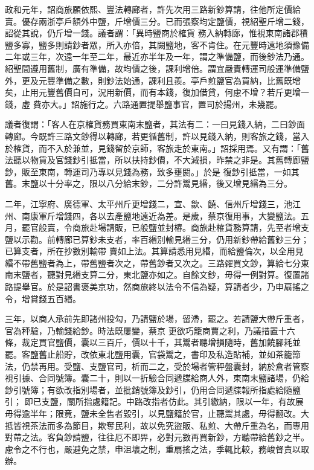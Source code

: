 \begin{pinyinscope}
 政和元年，詔商旅願依熙、豐法轉廊者，許先次用三路新鈔算請，往他所定價給賣。優存兩浙亭戶額外中鹽，斤增價三分。已而張察均定鹽價，視紹聖斤增二錢，詔從其說，仍斤增一錢。議者謂：「異時鹽商於榷貨
 務入納轉廊，惟視東南諸郡積鹽多寡，鹽多則請鈔者眾，所入亦倍，其闕鹽地，客不肯住。在元豐時遠地須豫備二年或三年，次遠一年至二年，最近亦半年及一年，謂之準備鹽，而後鈔法乃通。紹聖間遵用舊制，廣有準備，故均價之後，課利增倍。謂宜嚴責轉運司般運準備鹽外，更及元豐準備之數，則鈔法始通，課利且羨。亭戶煎鹽官為買納，比舊既增矣，止用元豐舊價自可，況用新價，而有本錢，復加借貸，何慮不增？若斤更增一錢，虛
 費亦大。」詔施行之。六路通置提舉鹽事官，置司於揚州，未幾罷。



 議者復謂：「客人在京榷貨務買東南末鹽者，其法有二：一曰見錢入納，二曰鈔面轉廊。今既許三路文鈔得以轉廊，若更循舊制，許以見錢入納，則客旅之錢，當入於榷貨，而不入於兼並，見錢留於京師，客旅走於東南。」詔採用焉。又有謂：「舊法聽以物貨及官錢鈔引抵當，所以扶持鈔價，不大減損，昨禁之非是。其舊轉廊鹽鈔，販至東南，轉運司乃專以見錢為務，致多壅閼。」於是
 復鈔引抵當，一如其舊。末鹽以十分率之，限以八分給末鈔，二分許鬻見緡，後又增見緡為三分。



 二年，江寧府、廣德軍、太平州斤更增錢二，宣、歙、饒、信州斤增錢三，池江州、南康軍斤增錢四，各以去產鹽地遠近為差。是歲，蔡京復用事，大變鹽法。五月，罷官般賣，令商旅赴場請販，已般鹽並封樁。商旅赴榷貨務算請，先至者增支鹽以示勸。前轉廊已算鈔未支者，率百緡別輸見緡三分，仍用新鈔帶給舊鈔三分；已算支者，所在抄數別輸帶
 賣如上法。其算請悉用見緡，而給鹽倫次，以全用見緡不帶舊鹽者為上，帶舊鹽者次之，帶舊鈔者又次之。三路糴買文鈔，算給七分東南末鹽者，聽對見緡支算二分，東北鹽亦如之。自餘文鈔，毋得一例對算。復置諸路提舉官。於是詔書褒美京功，然商旅終以法令不信為疑，算請者少，乃申扇搖之令，增賞錢五百緡。



 三年，以商人承前先即諸州投勾，乃請鹽於場，留滯，罷之。若請鹽大帶斤重者，官為秤驗，乃輸錢給鈔。時法既屢變，蔡京
 更欲巧籠商賈之利，乃議措置十六條，裁定買官鹽價，囊以三百斤，價以十千，其鬻者聽增損隨時，舊加饒腳耗並罷。客鹽舊止船貯，改依東北鹽用囊，官袋鬻之，書印及私造貼補，並如茶籠篰法，仍禁再用。受鹽、支鹽官司，析而二之，受於場者管秤盤囊封，納於倉者管察視引據、合同號簿。囊二十，則以一折驗合同遞牒給商人外，東南末鹽諸場，仍給鈔引號簿；有欲改指別場者，並批銷號簿及鈔引，仍用合同遞牒報所指處給隨鹽引；
 即已支鹽，關所指處籍記。中路改指者仿此。其引繳納，限以一年，有故展毋得逾半年；限竟，鹽未全售者毀引，以見鹽籍於官，止聽鬻其處，毋得翻改。大抵皆視茶法而多為節目，欺奪民利，故以免究盜販、私煎、大帶斤重為名，而專用對帶之法。客負鈔請鹽，往往厄不即畀，必對元數再買新鈔，方聽帶給舊鈔之半。慮令之不行也，嚴避免之禁，申沮壞之制，重扇搖之法，季輒比較，務峻督責以取辦。




\end{pinyinscope}
